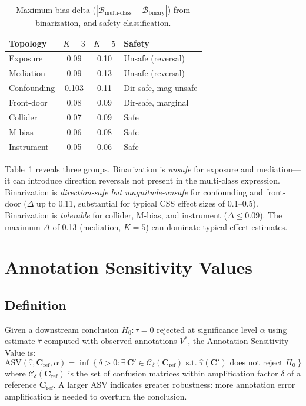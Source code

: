 \documentclass[11pt,letterpaper]{article}
\begin{document}
\begin{table}[t]
\centering
\small
\caption{Maximum bias delta ($|\mathcal{B}_{\text{multi-class}} - \mathcal{B}_{\text{binary}}|$) from binarization, and safety classification.}
\label{tab:binarization}
\begin{tabular}{@{}lccl@{}}
\toprule
\textbf{Topology} & $K{=}3$ & $K{=}5$ & \textbf{Safety} \\
\midrule
Exposure & 0.09 & 0.10 & Unsafe (reversal) \\
Mediation & 0.09 & 0.13 & Unsafe (reversal) \\
Confounding & 0.103 & 0.11 & Dir-safe, mag-unsafe \\
Front-door & 0.08 & 0.09 & Dir-safe, marginal \\
Collider & 0.07 & 0.09 & Safe \\
M-bias & 0.06 & 0.08 & Safe \\
Instrument & 0.05 & 0.06 & Safe \\
\bottomrule
\end{tabular}
\end{table}

Table~\ref{tab:binarization} reveals three groups.
Binarization is \emph{unsafe} for exposure and mediation---it can introduce direction reversals not present in the multi-class expression.
Binarization is \emph{direction-safe but magnitude-unsafe} for confounding and front-door ($\Delta$ up to 0.11, substantial for typical CSS effect sizes of 0.1--0.5).
Binarization is \emph{tolerable} for collider, M-bias, and instrument ($\Delta \leq 0.09$).
The maximum $\Delta$ of 0.13 (mediation, $K=5$) can dominate typical effect estimates.


\section{Annotation Sensitivity Values}
\label{sec:asv}

\subsection{Definition}

Given a downstream conclusion $H_0: \tau = 0$ rejected at significance level $\alpha$ using estimate $\hat{\tau}$ computed with observed annotations $V^*$, the Annotation Sensitivity Value is:
\[
\text{ASV}(\hat{\tau}, \mathbf{C}_{\text{ref}}, \alpha) = \inf\left\{\delta > 0 : \exists\, \mathbf{C}' \in \mathcal{C}_\delta(\mathbf{C}_{\text{ref}}) \text{ s.t.\ } \hat{\tau}(\mathbf{C}') \text{ does not reject } H_0\right\}
\]
where $\mathcal{C}_\delta(\mathbf{C}_{\text{ref}})$ is the set of confusion matrices within amplification factor $\delta$ of a reference $\mathbf{C}_{\text{ref}}$.
A larger ASV indicates greater robustness: more annotation error amplification is needed to overturn the conclusion.
\end{document}
